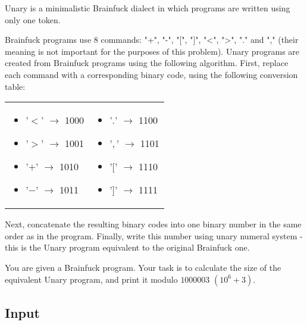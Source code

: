 Unary is a minimalistic Brainfuck dialect in which programs are written using only one token.

Brainfuck programs use 8 commands: "+", "-", "[", "]", "<", ">", "." and ","
(their meaning is not important for the purposes of this problem). Unary
programs are created from Brainfuck programs using the following algorithm.
First, replace each command with a corresponding binary code, using the
following conversion table:

\begin{table}[!h]
\centering
\begin{tabular}{ll}
\begin{minipage}[t]{3in}
\begin{itemize}
    \item '$<$' $\rightarrow$ 1000
    \item '$>$' $\rightarrow$ 1001
    \item '$+$' $\rightarrow$ 1010
    \item '$-$' $\rightarrow$ 1011
\end{itemize}
\vspace{1mm}
\end{minipage}
&
\begin{minipage}[t]{3in}
\begin{itemize}
   \item '$.$' $\rightarrow$ 1100
    \item '$,$' $\rightarrow$ 1101
    \item '$[$' $\rightarrow$ 1110
    \item '$]$' $\rightarrow$ 1111
\end{itemize}
\vspace{1mm}
\end{minipage} \\
\end{tabular}
\end{table}

Next, concatenate the resulting binary codes into one binary number in the same
order as in the program. Finally, write this number using unary numeral system
- this is the Unary program equivalent to the original Brainfuck one.

You are given a Brainfuck program. Your task is to calculate the size of the
equivalent Unary program, and print it modulo $1000003$ $(10^6 + 3)$.

\subsection*{Input}

